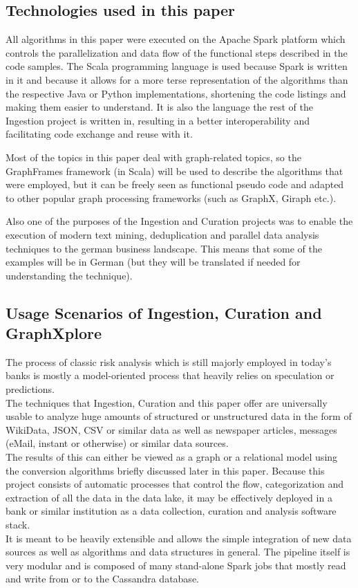 \documentclass[
        a4paper,     %
        titlepage,   %
        oneside,     %
        parskip      %
        ]{scrartcl}  %
\begin{document}
    \subsection{Technologies used in this paper}
    All algorithms in this paper were executed on the Apache Spark platform which
    controls the parallelization and data flow of the functional steps described
    in the code samples. The Scala programming language is used because Spark is
    written in it and because it allows for a more terse representation of the
    algorithms than the respective Java or Python implementations, shortening
    the code listings and making them easier to understand. It is also the language
    the rest of the Ingestion project is written in, resulting in a better interoperability
    and facilitating code exchange and reuse with it.

    Most of the topics in this paper deal with graph-related topics, so the GraphFrames framework
    (in Scala) will be used to describe the algorithms that were employed,
    but it can be freely seen as functional pseudo code and adapted to other popular
    graph processing frameworks (such as GraphX, Giraph etc.).

    Also one of the purposes of the Ingestion and Curation projects was to enable
    the execution of modern text mining, deduplication and parallel data analysis techniques
    to the german business landscape. This means that some of the examples will be
    in German (but they will be translated if needed for understanding the technique).

    \subsection{Usage Scenarios of Ingestion, Curation and GraphXplore}
    The process of classic risk analysis which is still majorly employed in today's banks is mostly
    a model-oriented process that heavily relies on speculation or predictions.\\
    The techniques that Ingestion, Curation and this paper offer are universally
    usable to analyze huge amounts of structured or unstructured data
    in the form of WikiData, JSON, CSV or similar data as well as newspaper articles,
    messages (eMail, instant or otherwise) or similar data sources.\\
    The results of this can either be viewed as a graph or a relational model
    using the conversion algorithms briefly discussed later in this paper.
    Because this project consists of automatic processes
    that control the flow, categorization and extraction
    of all the data in the data lake, it may be effectively deployed in a bank
    or similar institution as a data collection, curation and analysis software stack.\\
    It is meant to be heavily extensible and allows the simple integration of new data sources %
    as well as algorithms and data structures in general. The pipeline itself is very modular
    and is composed of many stand-alone Spark jobs that mostly read and write from or to the Cassandra database.
    \pagebreak
\end{document}
